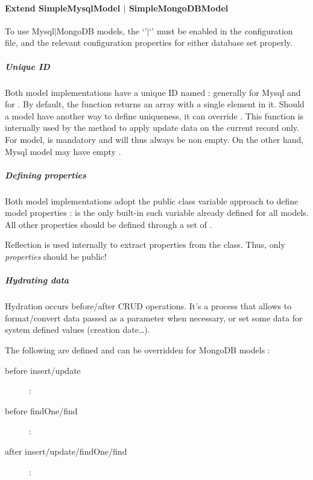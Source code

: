 \documentclass[pdftex,12pt,a4paper]{article}
\begin{document}
\paragraph{Extend SimpleMysqlModel $|$ SimpleMongoDBModel}
\begin{note}
	To use Mysql$|$MongoDB models, the  `'$|$`' must be enabled in the configuration file, and the relevant configuration properties for either database set properly.
\end{note}

\subparagraph{Unique ID}

Both model implementations have a unique ID named  : generally  for Mysql and  for . By default, the function  returns an array with a single element  in it. Should a model have another way to define uniqueness, it can override . This function is internally used by the  method to apply update data on the current record only.\\
For  model,  is mandatory and will thus always be non empty. On the other hand, Mysql model may have empty .

\subparagraph{Defining properties}

Both model implementations adopt the public class variable approach to define model properties :  is the only built-in such variable already defined for all models.
All other properties should be defined through a set of .\\
\begin{note}
Reflection is used internally to extract properties from the class. Thus, only \emph{properties} should be public!
\end{note}

\subparagraph{Hydrating data}

Hydration occurs before/after CRUD operations. It's a process that allows to format/convert data passed as a parameter when necessary, or set some data for system defined values (\eg creation date\ldots).

The following are defined and can be overridden for MongoDB models :
\begin{description}
	\item[before insert/update] : 
	\item[before findOne/find] : 
	\item[after insert/update/findOne/find] : 
\end{description}
\end{document}
